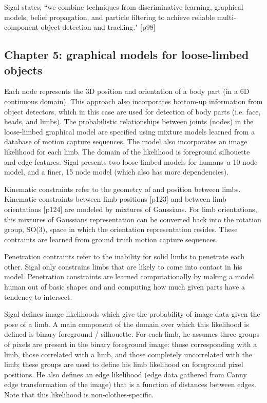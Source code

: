 \documentclass{article}
\begin{document}
Sigal states, ``we combine techniques from discriminative learning, graphical models, belief propagation, and particle filtering to achieve reliable multi-component object detection and tracking." [p98]


\subsection{Chapter 5: graphical models for loose-limbed objects}
\label{sec:sigal_chap5}

Each node represents the 3D position and orientation of a body part (in a 6D continuous domain).
This approach also incorporates bottom-up information from object detectors, which in this case are used for detection of body parts (i.e. face, heads, and limbs).
The probabilistic relationships between joints (nodes) in the loose-limbed graphical model are specified using mixture models learned from a database of motion capture sequences.
The model also incorporates an image likelihood for each limb. The domain of the likelihood is foreground silhouette and edge features.
Sigal presents two loose-limbed models for humans--a 10 node model, and a finer, 15 node model (which also has more dependencies).

Kinematic constraints refer to the geometry of and position between limbs. Kinematic constraints between limb positions [p123] and between limb orientations [p124] are modeled by mixtures of Gaussians.
For limb orientations, this mixtures of Gaussians representation can be converted back into the rotation group, SO(3), space in which the orientation representation resides.
These contraints are learned from ground truth motion capture sequences.

Penetration contraints refer to the inability for solid limbs to penetrate each other.
Sigal only constrains limbs that are likely to come into contact in his model.
Penetration constraints are learned computationally by making a model human out of basic shapes and and computing how much given parts have a tendency to intersect.

Sigal defines image likelihoods which give the probability of image data given the pose of a limb.
A main component of the domain over which this likelihood is defined is binary foreground / silhouette.
For each limb, he assumes three groups of pixels are present in the binary foreground image: those corresponding with a limb, those correlated with a limb, and those completely uncorrelated with the limb; these groups are used to define his limb likelihood on foreground pixel positions.
He also defines an edge likelihood (edge data gathered from Canny edge transformation of the image) that is a function of distances between edges.
Note that this likelihood is non-clothes-specific.
\end{document}
